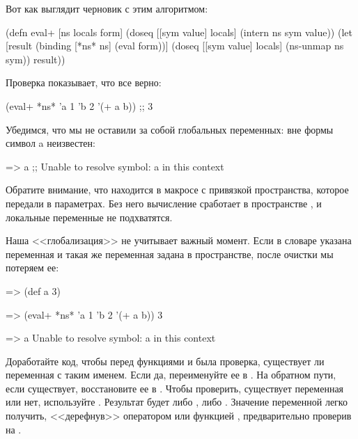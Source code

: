 \pagebreaklarge

Вот как выглядит черновик  с этим алгоритмом:

\begin{english}
  \begin{clojure/lines}
(defn eval+ [ns locals form]
  (doseq [[sym value] locals]
    (intern ns sym value))
  (let [result
        (binding [*ns* ns]
          (eval form))]
    (doseq [[sym value] locals]
      (ns-unmap ns sym))
    result))
  \end{clojure/lines}
\end{english}

Проверка показывает, что все верно:

\begin{english}
  \begin{clojure}
(eval+ *ns* {'a 1 'b 2} '(+ a b))
;; 3
  \end{clojure}
\end{english}

Убедимся, что мы не оставили за собой глобальных переменных: вне формы  символ a неизвестен:

\begin{english}
  \begin{text}
=> a
;; Unable to resolve symbol: a in this context
  \end{text}
\end{english}

Обратите внимание, что   находится в макросе  с привязкой пространства, которое передали в параметрах. Без него вычисление сработает в пространстве , и локальные переменные не подхватятся.

Наша <<глобализация>> не учитывает важный момент. Если в словаре указана переменная  и такая же переменная задана в пространстве, после очистки мы потеряем ее:

\begin{english}
  \begin{clojure}
=> (def a 3)

=> (eval+ *ns* {'a 1 'b 2} '(+ a b))
3

=> a
Unable to resolve symbol: a in this context
  \end{clojure}
\end{english}


Доработайте код, чтобы перед функциями  и  была проверка, существует ли переменная с таким именем. Если да, переименуйте ее в . На обратном пути, если  существует, восстановите ее в . Чтобы проверить, существует переменная или нет, используйте . Результат будет либо , либо . Значение переменной легко получить, <<дерефнув>>  оператором  или функцией , предварительно проверив на .

